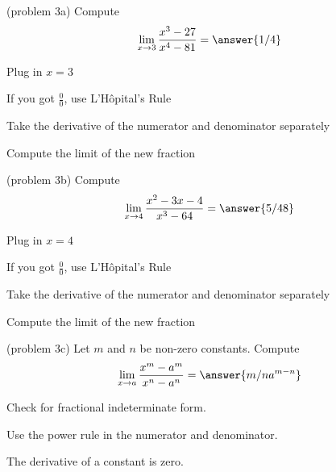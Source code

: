 \documentclass[handout]{ximera}
\begin{document}
\begin{problem}(problem 3a)
  Compute
  \[
  \lim_{x \to 3} \frac{x^3 - 27}{x^4 - 81} = \answer{1/4}
  \]
  
    \begin{hint}
      Plug in $x=3$
    \end{hint}
    \begin{hint}
      If you got $\frac00$, use L'H\^{o}pital's Rule
    \end{hint}
    \begin{hint}
      Take the derivative of the numerator and denominator separately
    \end{hint}
	  \begin{hint}
      Compute the limit of the new fraction
    \end{hint}
  
\end{problem}


\begin{problem}(problem 3b)
  Compute
  \[
  \lim_{x \to 4} \frac{x^2 - 3x - 4}{x^3 - 64} = \answer{5/48}
  \]
  
    \begin{hint}
      Plug in $x=4$
    \end{hint}
    \begin{hint}
      If you got $\frac00$, use L'H\^{o}pital's Rule
    \end{hint}
    \begin{hint}
      Take the derivative of the numerator and denominator separately
    \end{hint}
	  \begin{hint}
      Compute the limit of the new fraction
    \end{hint}
  
\end{problem}


\begin{problem}(problem 3c)
  Let $m$ and $n$ be non-zero constants. Compute
  \[
  \lim_{x \to a} \frac{x^m - a^m}{x^n - a^n} = \answer{m/n a^{m-n}}
  \]
  
    \begin{hint}
      Check for fractional indeterminate form.
    \end{hint}
    \begin{hint}
      Use the power rule in the numerator and denominator.
    \end{hint}
	  \begin{hint}
      The derivative of a constant is zero.
    \end{hint}
  
\end{problem}
\end{document}
